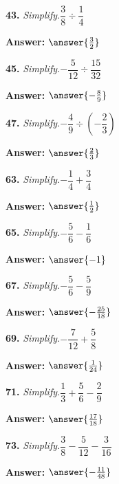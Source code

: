 \documentclass{ximera}
\begin{document}
\begin{problem}
\textbf{43.} \emph{Simplify.}\quad $\dfrac{3}{8} \div \dfrac{1}{4}$

\textbf{Answer:} $\answer{\frac{3}{2}}$
\end{problem}

\begin{problem}
\textbf{45.} \emph{Simplify.}\quad $-\dfrac{5}{12} \div \dfrac{15}{32}$

\textbf{Answer:} $\answer{-\frac{8}{9}}$
\end{problem}

\begin{problem}
\textbf{47.} \emph{Simplify.}\quad $-\dfrac{4}{9} \div \left(-\dfrac{2}{3}\right)$

\textbf{Answer:} $\answer{\frac{2}{3}}$
\end{problem}

\begin{problem}
\textbf{63.} \emph{Simplify.}\quad $-\dfrac{1}{4} + \dfrac{3}{4}$

\textbf{Answer:} $\answer{\frac{1}{2}}$
\end{problem}

\begin{problem}
\textbf{65.} \emph{Simplify.}\quad $-\dfrac{5}{6} - \dfrac{1}{6}$

\textbf{Answer:} $\answer{-1}$
\end{problem}

\begin{problem}
\textbf{67.} \emph{Simplify.}\quad $-\dfrac{5}{6} - \dfrac{5}{9}$

\textbf{Answer:} $\answer{-\frac{25}{18}}$
\end{problem}

\begin{problem}
\textbf{69.} \emph{Simplify.}\quad $-\dfrac{7}{12} + \dfrac{5}{8}$

\textbf{Answer:} $\answer{\frac{1}{24}}$
\end{problem}

\begin{problem}
\textbf{71.} \emph{Simplify.}\quad $\dfrac{1}{3} + \dfrac{5}{6} - \dfrac{2}{9}$

\textbf{Answer:} $\answer{\frac{17}{18}}$
\end{problem}

\begin{problem}
\textbf{73.} \emph{Simplify.}\quad $\dfrac{3}{8} - \dfrac{5}{12} - \dfrac{3}{16}$

\textbf{Answer:} $\answer{-\frac{11}{48}}$
\end{problem}
\end{document}
